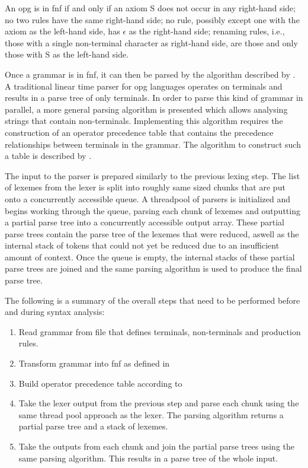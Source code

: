 An \gls{opg} is in \gls{fnf} if and only if an axiom S does not
occur in any right-hand side; no two rules have the same right-hand side;
no rule, possibly except one with the axiom as the left-hand side, has $\epsilon$ as
the right-hand side; renaming rules, i.e., those with a single non-terminal
character as right-hand side, are those and only those with S as the left-hand
side.

Once a grammar is in \gls{fnf}, it can then be parsed by the algorithm
described by \cite{barenghi_parallel_2015}. A traditional linear time parser
for \gls{opg} languages operates on terminals and results in a parse tree of
only terminals. In order to parse this kind of grammar in parallel, a more
general parsing algorithm is presented which allows analysing strings that
contain non-terminals. Implementing this algorithm requires the construction of
an operator precedence table that contains the precedence relationships between
terminals in the grammar. The algorithm to construct such a table is described
by \cite{grune_parsing_2008}.

The input to the parser is prepared similarly to the previous lexing step.
The list of lexemes from the lexer is split into roughly same sized chunks
that are put onto a concurrently accessible queue. A threadpool of parsers is
initialized and begins working through the queue, parsing each chunk of lexemes
and outputting a partial parse tree into a concurrently accessible output
array. These partial parse trees contain the parse tree of the lexemes that were
reduced, aswell as the internal stack of tokens that could not yet be reduced
due to an insufficient amount of context. Once the queue is empty, the internal
stacks of these partial parse trees are joined and the same parsing algorithm is
used to produce the final parse tree.

The following is a summary of the overall steps that need to be performed before
and during syntax analysis:

\begin{enumerate}
	\item Read grammar from file that defines terminals, non-terminals and
  		  production rules.
	\item Transform grammar into \gls{fnf} as defined in
		  \cite{barenghi_parallel_2015}
	\item Build operator precedence table according to \cite{grune_parsing_2008}
	\item Take the lexer output from the previous step and parse each chunk using
		  the same thread pool approach as the lexer. The parsing algorithm returns a
		  partial parse tree and a stack of lexemes.
	\item Take the outputs from each chunk and join the partial parse trees using
		  the same parsing algorithm. This results in a parse tree of the whole input.
\end{enumerate}


